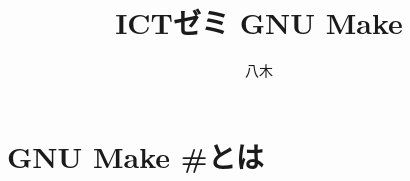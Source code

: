\documentclass[a4paper]{jarticle}
\title{ICTゼミ GNU Make}
\author{八木}
\begin{document}
\maketitle

\section{GNU Make \#とは}
\end{document}
